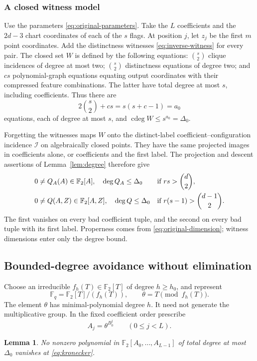 \documentclass[11pt,a4paper]{article}
\newcommand{\F}{\mathbb F}
\newcommand{\Ical}{\mathcal I}
\DeclareMathOperator{\cdeg}{cdeg}
\newtheorem{lemma}[theorem]{Lemma}
\theoremstyle{definition}
\theoremstyle{remark}
\numberwithin{equation}{section}
\begin{document}
\subsubsection{A closed witness model}
Use the parameters \eqref{eq:original-parameters}. Take the $L$ coefficients and the $2d-3$ chart coordinates of each of the $s$ flags. At position $j$, let $z_j$ be the first $m$ point coordinates. Add the distinctness witnesses \eqref{eq:inverse-witness} for every pair. The closed set $W$ is defined by the following equations: $\binom s2$ clique incidences of degree at most two; $\binom s2$ distinctness equations of degree two; and $cs$ polynomial-graph equations equating output coordinates with their compressed feature combinations. The latter have total degree at most $s$, including coefficients. Thus there are
\[
2\binom s2+cs=s(s+c-1)=a_0
\]
equations, each of degree at most $s$, and $\cdeg W\le s^{a_0}=\Delta_0$.

Forgetting the witnesses maps $W$ onto the distinct-label coefficient--configuration incidence $\Ical$ on algebraically closed points. They have the same projected images in coefficients alone, or coefficients and the first label. The projection and descent assertions of Lemma~\ref{lem:degree} therefore give
\begin{align}\label{eq:exceptional-original}
&0\ne Q_A(A)\in\F_2[A],\quad\deg Q_A\le\Delta_0
&&\text{if }rs>\binom d2,\notag\\
&0\ne Q(A,Z)\in\F_2[A,Z],\quad\deg Q\le\Delta_0
&&\text{if }r(s-1)>\binom{d-1}2.
\end{align}
The first vanishes on every bad coefficient tuple, and the second on every bad tuple with its first label. Properness comes from \eqref{eq:original-dimension}; witness dimensions enter only the degree bound.

\subsection{Bounded-degree avoidance without elimination}
Choose an irreducible $f_h(T)\in\F_2[T]$ of degree $h\ge h_0$, and represent
\[
\F_q=\F_2[T]/(f_h(T)),\qquad\theta=T\pmod{f_h(T)}.
\]
The element $\theta$ has minimal-polynomial degree $h$. It need not generate the multiplicative group. In the fixed coefficient order prescribe
\begin{equation}\label{eq:kronecker}
A_j=\theta^{B_0^j}\qquad(0\le j<L).
\end{equation}

\begin{lemma}\label{lem:kronecker}
No nonzero polynomial in $\F_2[A_0,\ldots,A_{L-1}]$ of total degree at most $\Delta_0$ vanishes at \eqref{eq:kronecker}.
\end{lemma}
\end{document}
